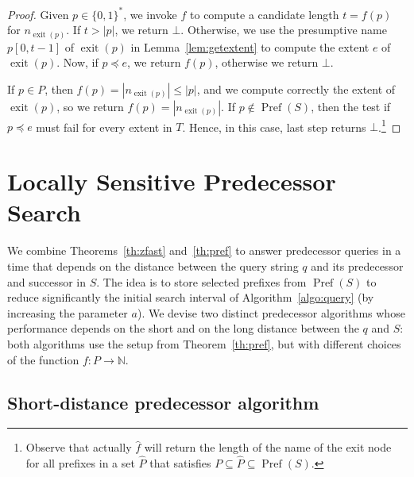 \documentclass[a4paper,11pt]{article}
\newcommand{\N}{\mathbb{N}}
\newcommand{\?}{\mskip1.5mu}
\DeclareMathOperator{\exit}{exit}
\DeclareMathOperator{\Pref}{Pref}
\begin{document}
\begin{proof}
Given $p \in \{0, 1\}^*$, we invoke
$f$ to compute a candidate length $t = f(p)$ 
for $n_{\exit(p)}$.
If $t > |p|$, we return $\bot$.
Otherwise,  we use the presumptive
name $p[0, t - 1]$ of $\exit(p)$ 
in Lemma~\ref{lem:getextent} to compute 
the extent $e$ of $\exit(p)$. Now, 
if $p  \preceq e$, we return $f(p)$, otherwise we return $\bot$.

If $p\in P$, then $f(p) = |n_{\exit(p)}| \leq |p|$, and we
compute correctly the extent of $\exit(p)$, so we return 
$f(p)=|n_{\exit(p)}|$.
If $p \not\in \Pref(S)$, then the test if 
$p \preceq e$ must fail for every extent in $T$. 
Hence, in this case, last step returns $\bot$.\footnote{Observe 
that actually $\widehat f$ will return the length 
of the name of the exit node for all prefixes in a set $\hat P$ that 
satisfies $P\subseteq \hat P\subseteq\Pref(S)$.}
\end{proof}

\section{Locally Sensitive Predecessor Search}
\label{sec:pred}

We combine Theorems~\ref{th:zfast} and~\ref{th:pref} 
to answer predecessor queries in a time that depends 
on the distance between the query string $q$ and its 
predecessor and successor in $S$. The idea 
is to store selected prefixes from $\Pref(S)$
to reduce significantly the initial search interval of
Algorithm~\ref{algo:query} (by increasing the parameter $a$).
We devise two distinct predecessor algorithms whose 
performance depends on the short and on the
long distance between the $q$ and $S$:
both algorithms use the setup from Theorem~\ref{th:pref}, but with 
different choices of the function $f:P\to \N$. 

\subsection{Short-distance predecessor algorithm}
\end{document}
